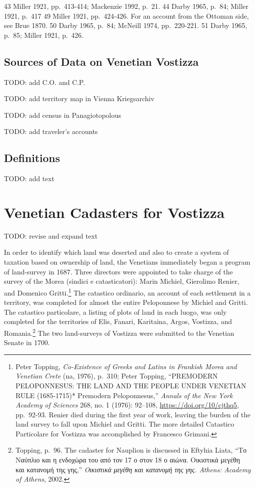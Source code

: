 \documentclass[english,]{book}
\begin{document}
43 Miller 1921, pp.~413-414; Mackenzie 1992, p.~21.
44 Darby 1965, p.~84; Miller 1921, p.~417
49 Miller 1921, pp.~424-426. For an account from the Ottoman side, see Brue 1870. 50 Darby 1965, p.~84; McNeill 1974, pp.~220-221.
51 Darby 1965, p.~85; Miller 1921, p.~426.

\hypertarget{sources}{%
\section{Sources of Data on Venetian Vostizza}\label{sources}}

TODO: add C.O. and C.P.

TODO: add territory map in Vienna Kriegsarchiv

TODO: add census in Panagiotopolous

TODO: add traveler's accounts

\hypertarget{definitions}{%
\section{Definitions}\label{definitions}}

TODO: add text

\hypertarget{cadasters}{%
\chapter{Venetian Cadasters for Vostizza}\label{cadasters}}

TODO: revise and expand text

In order to identify which land was deserted and also to create a system of taxation based on ownership of land, the Venetians immediately began a program of land-survey in 1687. Three directors were appointed to take charge of the survey of the Morea (sindici e catasticatori): Marin Michiel, Gierolimo Renier, and Domenico Gritti.\footnote{Peter Topping, \emph{Co-Existence of Greeks and Latins in Frankish Morea and Venetian Crete} (na, 1976), p.~310; Peter Topping, ``PREMODERN PELOPONNESUS: THE LAND AND THE PEOPLE UNDER VENETIAN RULE (1685‐1715)* Premodern Peloponnesus,'' \emph{Annals of the New York Academy of Sciences} 268, no. 1 (1976): 92--108, \url{https://doi.org/10/cjthq5}, pp.~92-93. Renier died during the first year of work, leaving the burden of the land survey to fall upon Michiel and Gritti. The more detailed Catastico Particolare for Vostizza was accomplished by Francesco Grimani.} The catastico ordinario, an account of each settlement in a territory, was completed for almost the entire Peloponnese by Michiel and Gritti. The catastico particolare, a listing of plots of land in each luogo, was only completed for the territories of Elis, Fanari, Karitaina, Argos, Vostizza, and Romania.\footnote{Topping, p.~96. The cadaster for Nauplion is discussed in Eftyhia Liata, ``Το Ναύπλιο και η ενδοχώρα του από τον 17 ο στον 18 ο αιώνα. Οικιστικά μεγέθη και κατανομή της γης,'' \emph{Οικιστικά μεγέθη και κατανομή της γης. Athens: Academy of Athens}, 2002.} The two land-surveys of Vostizza were submitted to the Venetian Senate in 1700.
\end{document}
